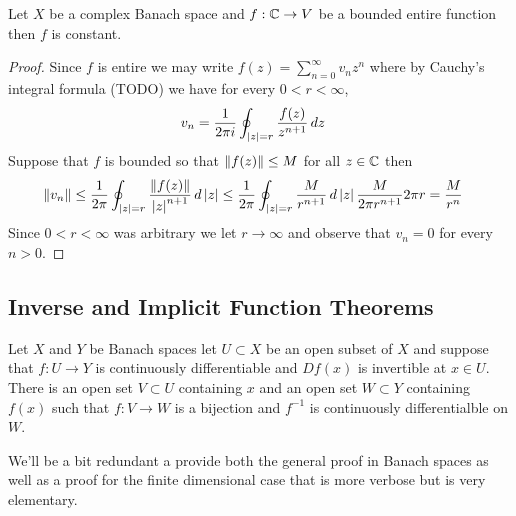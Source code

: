 \begin{thm}\label{banach:LiouvillesTheorem}Let $X$ be a complex Banach space and $f : \mathbb{C} \to V$ be a bounded entire function then $f$ is constant.
\end{thm}
\begin{proof}
Since $f$ is entire we may write $f(z) = \sum_{n=0}^\infty v_n z^n$ where by Cauchy's integral formula (TODO) we have for every $0 < r < \infty$,
\begin{align*}
v_n &= \frac{1}{2\pi i} \oint_{\left \vert z \right \vert = r} \frac{f(z)}{z^{n+1}} \, dz
\end{align*}
Suppose that $f$ is bounded so that $\left \lVert f(z) \right \rVert \leq M$ for all $z \in \mathbb{C}$ then
\begin{align*}
\left \lVert v_n \right \rVert &\leq \frac{1}{2\pi} \oint_{\left \vert z \right \vert = r} \frac{\left \lVert f(z) \right \rVert}{\left \vert z \right \vert^{n+1}} \, d\left \vert z \right \vert \leq \frac{1}{2\pi} \oint_{\left \vert z \right \vert = r} \frac{M}{r^{n+1}} \, d\left \vert z \right \vert \frac{M}{2\pi r^{n+1}}  2 \pi r = \frac{M}{r^n}
\end{align*}
Since $0 < r < \infty$ was arbitrary we let $r \to \infty$ and observe that $v_n = 0$ for every $n > 0$.
\end{proof}

\subsection{Inverse and Implicit Function Theorems}

\begin{thm}\label{InverseFunctionTheoremBanachSpaces}Let $X$ and $Y$ be Banach spaces let $U \subset X$ be an
  open subset of $X$ and suppose that $f : U \to Y$ is continuously
  differentiable and $Df(x)$ is invertible at $x \in U$.  There is an
  open set $V \subset U$ containing $x$ and an open set $W \subset Y$
  containing
  $f(x)$ such that $f : V \to W$ is a bijection and $f^{-1}$ is
  continuously differentialble on $W$.
\end{thm}

We'll be a bit redundant a  provide both the general proof in Banach spaces as
well as a proof for the finite dimensional case that is more verbose
but is very elementary.

